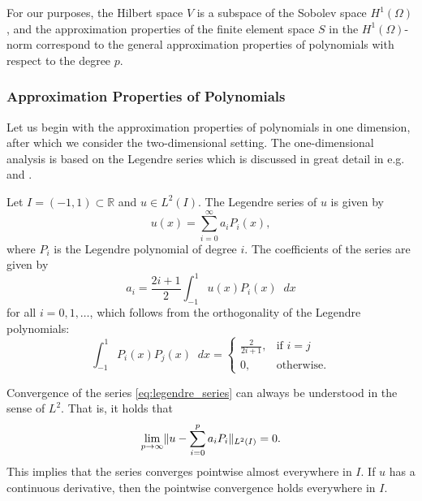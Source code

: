 \documentclass[english, 12pt, a4paper, sci, utf8, a-2b, online]{aaltothesis}
\theoremstyle{definition}
\theoremstyle{plain}
\DeclarePairedDelimiter\norm{\lVert}{\rVert}
\newcommand*\diff{\mathop{}\!d}
\numberwithin{equation}{section}
\begin{document}
For our purposes, the Hilbert space $V$ is a subspace of the Sobolev space $H^1(\Omega)$,
and the approximation properties of the finite element space $S$ in the $H^1(\Omega)$-norm
correspond to the general approximation properties of polynomials with respect to the degree $p$.

\subsubsection{Approximation Properties of Polynomials}
\label{subsubsec:approximation_properties_of_polynomials}

Let us begin with the approximation properties of polynomials in one dimension,
after which we consider the two-dimensional setting.
The one-dimensional analysis is based on the Legendre series
which is discussed in great detail in e.g.\ \cite{schwab1998} and \cite{andrews1998}.

Let $I = (-1,1) \subset \mathbb{R}$ and $u \in L^2(I)$.
The Legendre series of $u$ is given by
\begin{equation}
    \label{eq:legendre_series}
    u(x) = \sum_{i=0}^{\infty} a_i P_i(x),
\end{equation}
where $P_i$ is the Legendre polynomial of degree $i$.
The coefficients of the series are given by
\begin{equation*}
    a_i = \frac{2i+1}{2} \int_{-1}^{1} u(x) P_i(x) \diff x
\end{equation*}
for all $i=0,1,\dotsc$,
which follows from the orthogonality of the Legendre polynomials:
\begin{equation*}
    \int_{-1}^{1} P_i(x) P_j(x) \diff x =
    \begin{cases}
        \frac{2}{2i+1}, & \text{if } i = j \\
        0, & \text{otherwise}.
    \end{cases}
\end{equation*}

Convergence of the series \eqref{eq:legendre_series} can always be understood
in the sense of $L^2$. That is, it holds that
\begin{equation*}
    \lim_{p \to \infty} \norm{u - \sum_{i=0}^{\vphantom{n}\smash{p}} a_i P_i}_{L^2(I)} = 0.
\end{equation*}
This implies that the series converges pointwise almost everywhere in $I$.
If $u$ has a continuous derivative, then the pointwise convergence holds everywhere in $I$.
\end{document}
